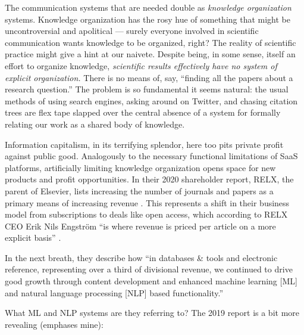 The communication systems that are needed double as \emph{knowledge
organization} systems. Knowledge organization has the rosy hue of
something that might be uncontroversial and apolitical --- surely
everyone involved in scientific communication wants knowledge to be
organized, right? The reality of scientific practice might give a hint
at our naivete. Despite being, in some sense, itself an effort to
organize knowledge, \emph{scientific results effectively have no system
of explicit organization.} There is no means of, say, ``finding all the
papers about a research question.'' The problem is so fundamental
it seems natural: the usual methods of using search engines, asking
around on Twitter, and chasing citation trees are flex tape slapped over
the central absence of a system for formally relating our work as a
shared body of knowledge.

Information capitalism, in its terrifying splendor, here too pits
private profit against public good. Analogously to the necessary
functional limitations of SaaS platforms, artificially limiting
knowledge organization opens space for new products and profit
opportunities. In their 2020 shareholder report, RELX, the parent of
Elsevier, lists increasing the number of journals and papers as a
primary means of increasing revenue \citep{RELXAnnualReport2020} .
This represents a shift in their business model from subscriptions to
deals like open access, which according to RELX CEO Erik Nils Engström
``is where revenue is priced per article on a more explicit basis'' \citep{relx2020ResultsPresentation2021} .

In the next breath, they describe how ``in databases \& tools and
electronic reference, representing over a third of divisional revenue, we continued to drive good growth through
content development and enhanced machine learning {[}ML{]} and natural
language processing {[}NLP{]} based functionality.''

What ML and NLP systems are they referring to? The 2019 report is a bit
more revealing (emphases mine):

